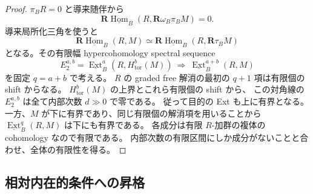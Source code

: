 \begin{proof}
$\pi_BR=0$ と導来随伴から
\[
 \mathbf R\underline{\operatorname{Hom}}_B(R,\mathbf R\omega_B\pi_BM)=0.
\]
導来局所化三角を使うと
\[
 \mathbf R\underline{\operatorname{Hom}}_B(R,M)
 \simeq
 \mathbf R\underline{\operatorname{Hom}}_B(R,\mathbf R\tau_BM)
\]
となる。その有限幅 hypercohomology spectral sequence
\[
 E_2^{a,b}=
 \underline{\operatorname{Ext}}^a_B(R,H^b_{\mathrm{tor}}(M))
 \ \Longrightarrow\ 
 \underline{\operatorname{Ext}}^{a+b}_B(R,M)
\]
を固定 $q=a+b$ で考える。
$R$ の graded free 解消の最初の $q+1$ 項は有限個の shift からなる。
$H^b_{\mathrm{tor}}(M)$ の上界とこれら有限個の shift から、
この対角線の $E_2^{a,b}$ は全て内部次数 $d\gg0$ で零である。
従って目的の Ext も上に有界となる。
一方、$M$ が下に有界であり、同じ有限個の解消項を用いることから
$\underline{\operatorname{Ext}}^q_B(R,M)$ は下にも有界である。
各成分は有限 $R$-加群の複体の cohomology なので有限である。
内部次数の有限区間にしか成分がないことと合わせ、全体の有限性を得る。
\end{proof}

\subsection{相対内在的条件への昇格}

